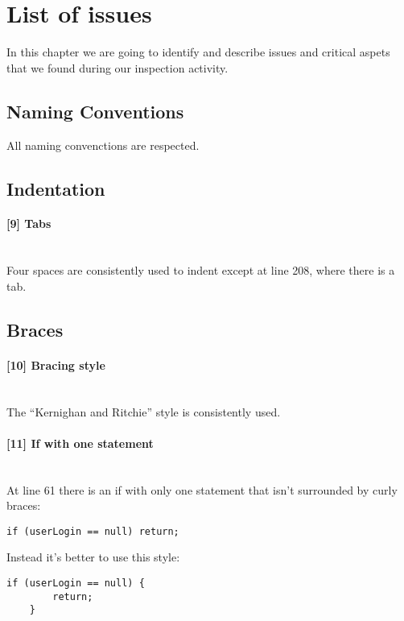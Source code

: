 
\newcommand{\issue}[2][?]{
	\paragraph{[#1] #2} \mbox{}\\
}

\pagebreak
\section{List of issues}
In this chapter we are going to identify and describe issues and critical aspets that we found during our inspection activity.

\subsection{Naming Conventions}

All naming convenctions are respected.

\subsection{Indentation}

\issue[9]{Tabs}
	Four spaces are consistently used to indent except at line 208, where there is a tab.

\subsection{Braces}

\issue[10]{Bracing style}
	The ``Kernighan and Ritchie'' style is consistently used.

\issue[11]{If with one statement}
	At line 61 there is an if with only one statement that isn't surrounded by curly braces:
	\begin{lstlisting}[basicstyle=\small\ttfamily,columns=fullflexible]
	if (userLogin == null) return;
	\end{lstlisting}
	Instead it's better to use this style:
	\begin{lstlisting}[basicstyle=\small\ttfamily,columns=fullflexible]
	if (userLogin == null) {
		return;
	}
	\end{lstlisting}


